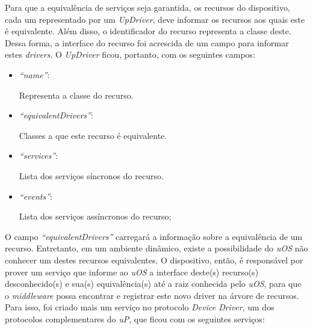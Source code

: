 Para que a equivalência de serviços seja garantida, os recursos do dispositivo, cada um representado por um \emph{UpDriver}, deve informar os recursos aos quais este é equivalente. Além disso, o identificador do recurso representa a classe deste. Dessa forma, a interface do recurso foi acrescida de um campo para informar estes \emph{drivers}. O \emph{UpDriver} ficou, portanto, com os seguintes campos:

\begin{itemize}
	\item \emph{``name''}:
		
		Representa a classe do recurso.
	\item \emph{``equivalentDrivers''}:
	
		Classes a que este recurso é equivalente.
	\item \emph{``services''}:

		Lista dos serviços síncronos do recurso.
	\item \emph{``events''}:

		Lista dos serviços assíncronos do recurso;
\end{itemize}

O campo \emph{``equivalentDrivers''} carregará a informação sobre a equivalência de um recurso. Entretanto, em um ambiente dinâmico, existe a possibilidade do \emph{uOS} não conhecer um destes recursos equivalentes. O dispositivo, então, é responsável por prover um serviço que informe ao \emph{uOS} a interface deste(s) recurso(s) desconhecido(s) e sua(s) equivalência(s) até a raiz conhecida pelo \emph{uOS}, para que o \emph{middleware} possa encontrar e registrar este novo driver na árvore de recursos. Para isso, foi criado mais um serviço no protocolo \emph{Device Driver}, um dos protocolos complementares do \emph{uP}, que ficou com os seguintes serviços:

